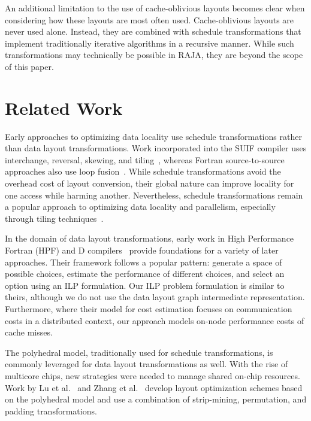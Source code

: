 \documentclass[sigconf,review=true]{acmart}
\begin{document}
An additional limitation to the use of cache-oblivious layouts becomes clear when considering how these layouts are most often used. Cache-oblivious layouts are never used alone. Instead, they are combined with schedule transformations that implement traditionally iterative algorithms in a recursive manner. While such transformations may technically be possible in RAJA, they are beyond the scope of this paper. 

\section{Related Work}

Early approaches to optimizing data locality use schedule transformations rather than data layout transformations. 
Work incorporated into the SUIF compiler uses interchange, reversal, skewing, and tiling~\cite{wolf1991data}, whereas Fortran source-to-source approaches also use loop fusion~\cite{mckinley1996improving}.
While schedule transformations avoid the overhead cost of layout conversion, their global nature can improve locality for one access while harming another.
Nevertheless, schedule transformations remain a popular approach to optimizing data locality and parallelism, 
especially through tiling techniques~\cite{bondhugula2008pluto,bertolacci2015parameterized,bondhugula2016diamond,bandishti2012tiling,unat2016tida}.

In the domain of data layout transformations, early work in High Performance Fortran (HPF) and D compilers~\cite{bixby1994automatic,kennedy1995automatic,kennedy1998automatic} provide foundations for a variety of later approaches.
Their framework follows a popular pattern: generate a space of possible choices, estimate the performance of different choices, and select an option using an ILP formulation. 
Our ILP problem formulation is similar to theirs, although we do not use the data layout graph intermediate representation.
Furthermore, where their model for cost estimation focuses on communication costs in a distributed context, our approach models on-node performance costs of cache misses.

The polyhedral model, traditionally used for schedule transformations, is commonly leveraged for data layout transformations as well.
With the rise of multicore chips, new strategies were needed to manage shared on-chip resources. 
Work by Lu et al.~\cite{lu2009data} and Zhang et al.~\cite{zhang2011optimizing} develop layout optimization schemes based on the polyhedral model and use a combination of strip-mining, permutation, and padding transformations.
\end{document}
